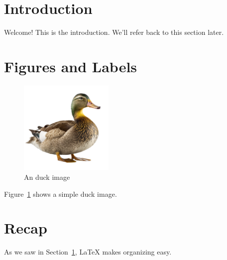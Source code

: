 \documentclass{article}
\begin{document}
\section{Introduction}
\label{sec:intro}

Welcome! This is the introduction. We'll refer back to this section later.

\section{Figures and Labels}
\label{sec:figs}

\begin{figure}[h!]
\centering
\includegraphics[width=0.4\textwidth]{duck.png}
\caption{An duck image}
\label{fig:lab_ref}
\end{figure}

Figure~\ref{fig:lab_ref} shows a simple duck image.

\section{Recap}
As we saw in Section~\ref{sec:intro}, LaTeX makes organizing easy.
\end{document}
